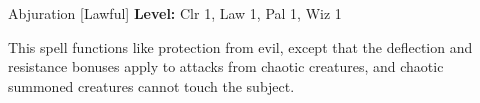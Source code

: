 {Abjuration [Lawful]}
{
	\textbf{Level:}
	Clr 1, Law 1, Pal 1, Wiz 1\\
}
{
	This spell functions like protection from evil, except that the deflection and resistance bonuses apply to attacks from chaotic creatures, and chaotic summoned creatures cannot touch the subject.

}
